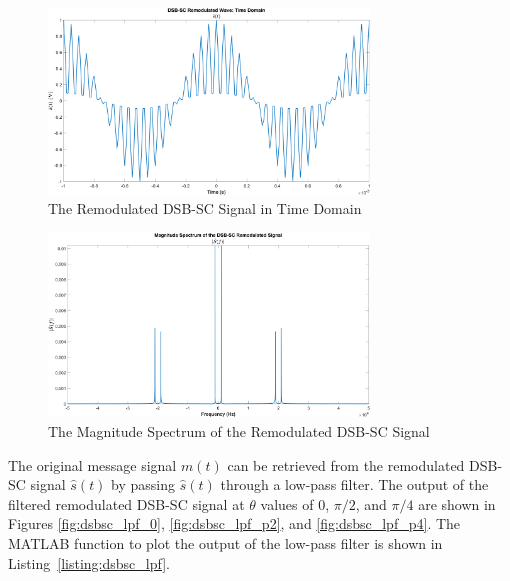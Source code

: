 \documentclass[12pt]{article}
\begin{document}
\begin{figure}[h]
    \centering
    \includegraphics[width=0.76\textwidth]{dsbsc_remod_time}
    \caption{\label{fig:dsbsc_remod_time}The Remodulated DSB-SC Signal in Time Domain}
\end{figure}
\begin{figure}[h]
    \centering
    \includegraphics[width=0.76\textwidth]{dsbsc_remod_freq}
    \caption{\label{fig:dsbsc_remod_freq}The Magnitude Spectrum of the Remodulated DSB-SC Signal}
\end{figure} \clearpage

The original message signal $m(t)$ can be retrieved from the remodulated DSB-SC signal $\hat{s}(t)$ by passing $\hat{s}(t)$ through a low-pass filter. The output of the filtered remodulated DSB-SC signal at $\theta$ values of $0$, $\pi/2$, and $\pi/4$ are shown in Figures \ref{fig:dsbsc_lpf_0}, \ref{fig:dsbsc_lpf_p2}, and \ref{fig:dsbsc_lpf_p4}. The MATLAB function to plot the output of the low-pass filter is shown in Listing~\ref{listing:dsbsc_lpf}.


\end{document}
